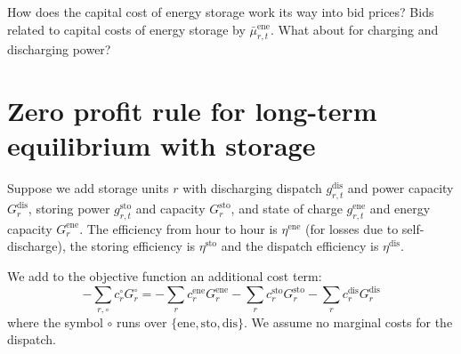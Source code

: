 \documentclass[final,3p,times]{elsarticle}
\begin{document}
How does the capital cost of energy storage work its way into bid prices? Bids related to capital costs of energy storage by $\bar{\mu}^{\textrm{ene}}_{r,t}$. What about for charging and discharging power?


\appendix


\section{Zero profit rule for long-term equilibrium with storage}\label{sec:storage}


Suppose we add storage units $r$ with discharging dispatch $g^{\textrm{dis}}_{r,t}$ and power capacity $G^{\textrm{dis}}_{r}$, storing power $g^{\textrm{sto}}_{r,t}$ and capacity $G^{\textrm{sto}}_{r}$, and state of charge $g^{\textrm{ene}}_{r,t}$ and energy capacity $G^{\textrm{ene}}_{r}$. The efficiency from hour to hour is $\eta^{\textrm{ene}}$ (for losses due to self-discharge), the storing efficiency is $\eta^{\textrm{sto}}$ and the dispatch efficiency is $\eta^{\textrm{dis}}$.

We add to the objective function an additional cost term:
\begin{equation*}
  -\sum_{r,\circ} c^\circ_r G^\circ_r =  -\sum_r c^{\textrm{ene}}_r G^{\textrm{ene}}_r -\sum_r c^{\textrm{sto}}_r G^{\textrm{sto}}_r -\sum_r c^{\textrm{dis}}_r G^{\textrm{dis}}_r
\end{equation*}
where the symbol $\circ$ runs over $\{\textrm{ene},\textrm{sto},\textrm{dis}\}$. We assume no marginal costs for the dispatch.
\end{document}
